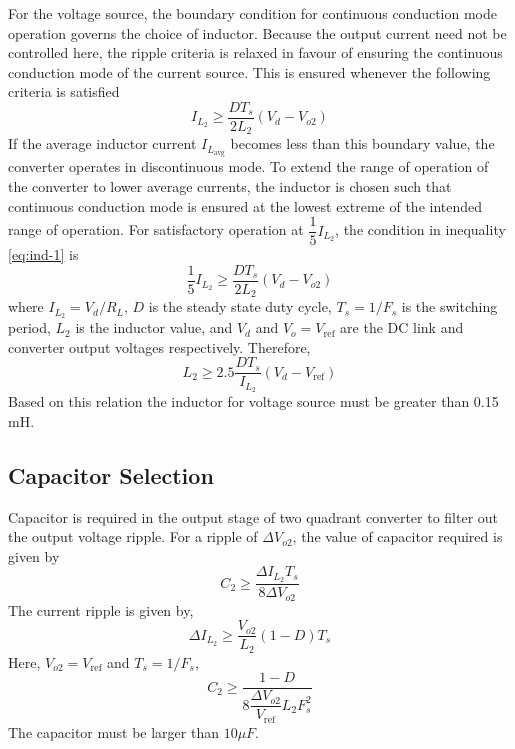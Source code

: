 	For the voltage source, the boundary condition for continuous conduction mode operation governs the choice of inductor. Because the output current need not be controlled here, the ripple criteria is relaxed in favour of ensuring the continuous conduction mode of the current source. This is ensured whenever the following criteria is satisfied \cite{book:768263}
	\begin{equation}
		I_{L_2} \geq \dfrac{DT_s}{2L_2}(V_d-V_{o2})
		\label{eq:ind-2}
	\end{equation}
	If the average inductor current $I_{L_{\text{avg}}}$ becomes less than this boundary value, the converter operates in discontinuous mode. To extend the range of operation of the converter to lower average currents, the inductor is chosen such that continuous conduction mode is ensured at the lowest extreme of the intended range of operation. For satisfactory operation \cite{muhamad2005design} at $\dfrac{1}{5}I_{L_2}$, the condition in inequality \eqref{eq:ind-1} is
	\begin{equation}
		\dfrac{1}{5}I_{L_2} \geq \dfrac{DT_s}{2L_2}(V_d-V_{o2})
		\label{eq:ind-3}
	\end{equation}
	where $I_{L_2} = V_d / R_L$, $D$ is the steady state duty cycle, $T_s = 1 / F_s$ is the switching period, $L_2$ is the inductor value, and $V_d$ and $V_o = V_{\text{ref}}$ are the DC link and converter output voltages respectively. 
	Therefore,
	\begin{equation}
		L_2 \geq 2.5\dfrac{DT_s}{I_{L_2}}(V_d-V_{\text{ref}})
		\label{eq:ind-4}
	\end{equation}
	Based on this relation the inductor for voltage source must be greater than 0.15 mH.

\subsection{Capacitor Selection}
	Capacitor is required in the output stage of two quadrant converter to filter out the output voltage ripple. For a ripple of $\Delta V_{o2}$, the value of capacitor required is given by\cite{book:768263}
	\begin{equation}
		C_2 \geq \dfrac{\Delta I_{L_2}T_s}{8\Delta V_{o2}}
		\label{eq:ind-4a}
	\end{equation}
	The current ripple is given by,
	\begin{equation}
		\Delta I_{L_2} \geq \dfrac{V_{o2}}{L_2}(1-D) T_s
		\label{eq:ind-4b}
	\end{equation}
	Here, $V_{o2} = V_{\text{ref}}$ and $T_s = 1 / F_s$,
	\begin{equation}
		C_2 \geq \dfrac{1 - D}{8 \dfrac{\Delta V_{o2}}{V_{\text{ref}}}L_2 F_s^2}
		\label{eq:ind-5}
	\end{equation}
	The capacitor must be larger than $10 \mu F$.
	
